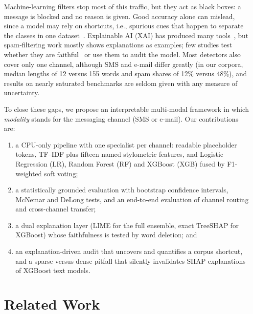 \documentclass[conference]{IEEEtran}
\begin{document}
Machine-learning filters stop most of this traffic, but they act as black
boxes: a message is blocked and no reason is given. Good accuracy alone can
mislead, since a model may rely on shortcuts, i.e., spurious cues that happen
to separate the classes in one dataset~\cite{du2024shortcut}. Explainable AI
(XAI) has produced many tools~\cite{longo2024xai}, but spam-filtering work
mostly shows explanations as examples; few studies test whether they are
faithful~\cite{lyu2024faithful} or use them to audit the model. Most detectors
also cover only one channel, although SMS and e-mail differ greatly (in our
corpora, median lengths of 12 versus 155 words and spam shares of 12\% versus
48\%), and results on nearly saturated benchmarks are seldom given with any
measure of uncertainty.

To close these gaps, we propose an interpretable multi-modal framework in
which \emph{modality} stands for the messaging channel (SMS or e-mail). Our
contributions are:
\begin{enumerate}
  \item a CPU-only pipeline with one specialist per channel: readable
        placeholder tokens, TF--IDF plus fifteen named stylometric features,
        and Logistic Regression (LR), Random Forest (RF) and XGBoost (XGB)
        fused by F1-weighted soft voting;
  \item a statistically grounded evaluation with bootstrap confidence
        intervals, McNemar and DeLong tests, and an end-to-end evaluation of
        channel routing and cross-channel transfer;
  \item a dual explanation layer (LIME for the full ensemble, exact TreeSHAP
        for XGBoost) whose faithfulness is tested by word deletion; and
  \item an explanation-driven audit that uncovers and quantifies a corpus
        shortcut, and a sparse-versus-dense pitfall that silently invalidates
        SHAP explanations of XGBoost text models.
\end{enumerate}

\section{Related Work}\label{sec:related}
\end{document}

